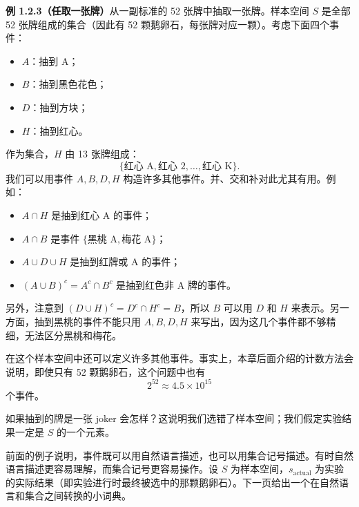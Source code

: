 \documentclass[UTF8, 12pt, fontset=fandol, oneside]{ctexart}
\begin{document}
\noindent\textbf{例 1.2.3（任取一张牌）}\quad 从一副标准的 52 张牌中抽取一张牌。样本空间 $S$ 是全部 52 张牌组成的集合（因此有 52 颗鹅卵石，每张牌对应一颗）。考虑下面四个事件：
\begin{itemize}
  \item $A$：抽到 A；
  \item $B$：抽到黑色花色；
  \item $D$：抽到方块；
  \item $H$：抽到红心。
\end{itemize}
作为集合，$H$ 由 13 张牌组成：
\[
  \{\text{红心 A},\text{红心 2},\ldots,\text{红心 K}\}.
\]
我们可以用事件 $A,B,D,H$ 构造许多其他事件。并、交和补对此尤其有用。例如：
\begin{itemize}
  \item $A\cap H$ 是抽到红心 A 的事件；
  \item $A\cap B$ 是事件 $\{\text{黑桃 A},\text{梅花 A}\}$；
  \item $A\cup D\cup H$ 是抽到红牌或 A 的事件；
  \item $(A\cup B)^c=A^c\cap B^c$ 是抽到红色非 A 牌的事件。
\end{itemize}
另外，注意到 $(D\cup H)^c=D^c\cap H^c=B$，所以 $B$ 可以用 $D$ 和 $H$ 来表示。另一方面，抽到黑桃的事件不能只用 $A,B,D,H$ 来写出，因为这几个事件都不够精细，无法区分黑桃和梅花。

在这个样本空间中还可以定义许多其他事件。事实上，本章后面介绍的计数方法会说明，即使只有 52 颗鹅卵石，这个问题中也有
\[
  2^{52}\approx 4.5\times 10^{15}
\]
个事件。

如果抽到的牌是一张 joker 会怎样？这说明我们选错了样本空间；我们假定实验结果一定是 $S$ 的一个元素。

前面的例子说明，事件既可以用自然语言描述，也可以用集合记号描述。有时自然语言描述更容易理解，而集合记号更容易操作。设 $S$ 为样本空间，$s_{\text{actual}}$ 为实验的实际结果（即实验进行时最终被选中的那颗鹅卵石）。下一页给出一个在自然语言和集合之间转换的小词典。
\end{document}
